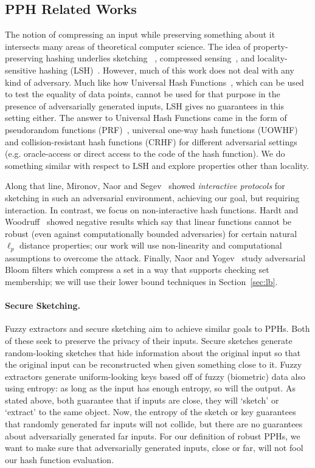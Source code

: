 \subsection{PPH Related Works}
The notion of compressing an input while preserving something about it intersects many areas of theoretical computer science. The idea of property-preserving hashing underlies sketching ~\cite{MunroP80,DBLP:journals/scp/MisraG82,AlonMS96,CormodeM05,CharikarCF04}, compressed sensing~\cite{ChenDS01}, and locality-sensitive hashing (LSH)~\cite{IndykM98}. However, much of this work does not deal with any kind of adversary. Much like how Universal Hash Functions~\cite{CarterW77}, which can be used to test the equality of data points, cannot be used for that purpose in the presence of adversarially generated inputs, LSH gives no guarantees in this setting either. The answer to Universal Hash Functions came in the form of pseudorandom functions (PRF)~\cite{GoldreichGM86}, universal one-way hash functions (UOWHF)~\cite{NaorY89} and collision-resistant hash functions (CRHF) for different adversarial settings (e.g. oracle-access or direct access to the code of the hash function). We do something similar with respect to LSH and explore properties other than locality.

Along that line, Mironov, Naor and Segev~\cite{MNS08} showed {\em interactive protocols} for sketching in such an adversarial environment, achieving our goal, but requiring interaction. In contrast, we focus on non-interactive hash functions. Hardt and Woodruff~\cite{HW13} showed negative results which say that linear functions cannot be robust (even against computationally bounded adversaries) for certain natural $\ell_p$ distance properties; our work will use non-linearity and computational assumptions to overcome the \cite{HW13} attack. Finally, Naor and Yogev~\cite{NY15} study adversarial Bloom filters which compress a set in a way that supports checking set membership; we will use their lower bound techniques in Section~\ref{sec:lb}.

\paragraph{Secure Sketching.}
Fuzzy extractors and secure sketching \cite{DORS08} aim to achieve similar goals to PPHs. Both of these seek to preserve the privacy of their inputs. Secure sketches generate random-looking sketches that hide information about the original input so that the original input can be reconstructed when given something close to it. Fuzzy extractors generate uniform-looking keys based off of fuzzy (biometric) data also using entropy: as long as the input has enough entropy, so will the output. As stated above, both guarantee that if inputs are close, they will `sketch' or `extract' to the same object. Now, the entropy of the sketch or key guarantees that randomly generated far inputs will not collide, but there are no guarantees about adversarially generated far inputs. For our definition of robust PPHs, we want to make sure that adversarially generated inputs, close or far, will not fool our hash function evaluation.


